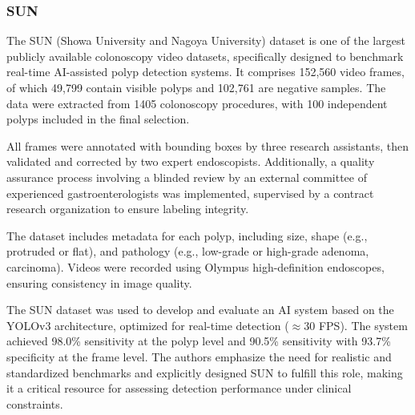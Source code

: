 \subsubsection*{SUN}

The SUN (Showa University and Nagoya University) dataset is one of the largest publicly available colonoscopy video datasets, specifically designed to benchmark real-time AI-assisted polyp detection systems. It comprises 152{,}560 video frames, of which 49{,}799 contain visible polyps and 102{,}761 are negative samples. The data were extracted from 1405 colonoscopy procedures, with 100 independent polyps included in the final selection.

All frames were annotated with bounding boxes by three research assistants, then validated and corrected by two expert endoscopists. Additionally, a quality assurance process involving a blinded review by an external committee of experienced gastroenterologists was implemented, supervised by a contract research organization to ensure labeling integrity.

The dataset includes metadata for each polyp, including size, shape (e.g., protruded or flat), and pathology (e.g., low-grade or high-grade adenoma, carcinoma). Videos were recorded using Olympus high-definition endoscopes, ensuring consistency in image quality.

The SUN dataset was used to develop and evaluate an AI system based on the YOLOv3 architecture, optimized for real-time detection ($\approx$30 FPS). The system achieved 98.0\% sensitivity at the polyp level and 90.5\% sensitivity with 93.7\% specificity at the frame level. The authors emphasize the need for realistic and standardized benchmarks and explicitly designed SUN to fulfill this role, making it a critical resource for assessing detection performance under clinical constraints.

